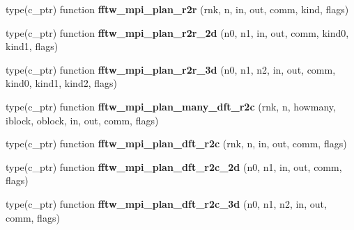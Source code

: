 \begin{DoxyCompactItemize}
\item 
type(c\+\_\+ptr) function {\bfseries fftw\+\_\+mpi\+\_\+plan\+\_\+r2r} (rnk, n, in, out, comm, kind, flags)\hypertarget{interfacefftw3_1_1fftw__mpi__plan__gen_a6e99b91a2fc52e6d23fb29a9ac5eff4a}{}\label{interfacefftw3_1_1fftw__mpi__plan__gen_a6e99b91a2fc52e6d23fb29a9ac5eff4a}

\item 
type(c\+\_\+ptr) function {\bfseries fftw\+\_\+mpi\+\_\+plan\+\_\+r2r\+\_\+2d} (n0, n1, in, out, comm, kind0, kind1, flags)\hypertarget{interfacefftw3_1_1fftw__mpi__plan__gen_a7610898725e1efdf66832ead2ba606e5}{}\label{interfacefftw3_1_1fftw__mpi__plan__gen_a7610898725e1efdf66832ead2ba606e5}

\item 
type(c\+\_\+ptr) function {\bfseries fftw\+\_\+mpi\+\_\+plan\+\_\+r2r\+\_\+3d} (n0, n1, n2, in, out, comm, kind0, kind1, kind2, flags)\hypertarget{interfacefftw3_1_1fftw__mpi__plan__gen_a645697c25e532a3a28aacf849757c59e}{}\label{interfacefftw3_1_1fftw__mpi__plan__gen_a645697c25e532a3a28aacf849757c59e}

\item 
type(c\+\_\+ptr) function {\bfseries fftw\+\_\+mpi\+\_\+plan\+\_\+many\+\_\+dft\+\_\+r2c} (rnk, n, howmany, iblock, oblock, in, out, comm, flags)\hypertarget{interfacefftw3_1_1fftw__mpi__plan__gen_aae4dd779d6aa023ca8d1459830ef2cdc}{}\label{interfacefftw3_1_1fftw__mpi__plan__gen_aae4dd779d6aa023ca8d1459830ef2cdc}

\item 
type(c\+\_\+ptr) function {\bfseries fftw\+\_\+mpi\+\_\+plan\+\_\+dft\+\_\+r2c} (rnk, n, in, out, comm, flags)\hypertarget{interfacefftw3_1_1fftw__mpi__plan__gen_a8df78874c02f7af037371501e49883f6}{}\label{interfacefftw3_1_1fftw__mpi__plan__gen_a8df78874c02f7af037371501e49883f6}

\item 
type(c\+\_\+ptr) function {\bfseries fftw\+\_\+mpi\+\_\+plan\+\_\+dft\+\_\+r2c\+\_\+2d} (n0, n1, in, out, comm, flags)\hypertarget{interfacefftw3_1_1fftw__mpi__plan__gen_a96a81f2c9203326dda28a1bf9f52d16e}{}\label{interfacefftw3_1_1fftw__mpi__plan__gen_a96a81f2c9203326dda28a1bf9f52d16e}

\item 
type(c\+\_\+ptr) function {\bfseries fftw\+\_\+mpi\+\_\+plan\+\_\+dft\+\_\+r2c\+\_\+3d} (n0, n1, n2, in, out, comm, flags)\hypertarget{interfacefftw3_1_1fftw__mpi__plan__gen_aeeec0041eeb1403292fecc7b340acc36}{}\label{interfacefftw3_1_1fftw__mpi__plan__gen_aeeec0041eeb1403292fecc7b340acc36}


\end{DoxyCompactItemize}
